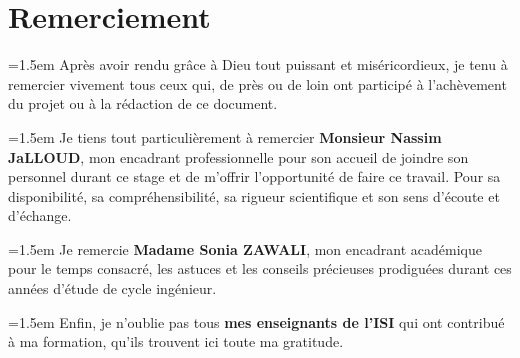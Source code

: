 \chapter*{Remerciement}
\begin{center}
    

\par \parindent=1.5em Après avoir rendu grâce à Dieu tout puissant et miséricordieux, je tenu à remercier vivement tous ceux
qui, de près ou de loin ont participé à l’achèvement du projet ou à la rédaction de ce document. 
\vspace{0.5cm}
\par \parindent=1.5em Je tiens tout particulièrement à remercier\textbf{ Monsieur Nassim JaLLOUD}, mon encadrant professionnelle
pour son accueil de joindre son personnel durant ce stage et de m'offrir l’opportunité de faire ce
travail. Pour sa disponibilité, sa compréhensibilité, sa rigueur scientifique et son sens d’écoute et
d’échange.
\vspace{0.5cm}
\par \parindent=1.5em Je remercie \textbf{ Madame Sonia ZAWALI}, mon encadrant académique pour le temps consacré, les astuces et les conseils précieuses prodiguées durant ces années d'étude de cycle ingénieur.
\vspace{0.5cm}

\par \parindent=1.5em Enfin, je n’oublie pas tous \textbf{mes enseignants de l’ISI} qui ont contribué à ma formation, qu’ils trouvent ici toute ma gratitude.
\end{center}
\begin{flushright}
    \LARGE \@author
\end{flushright}